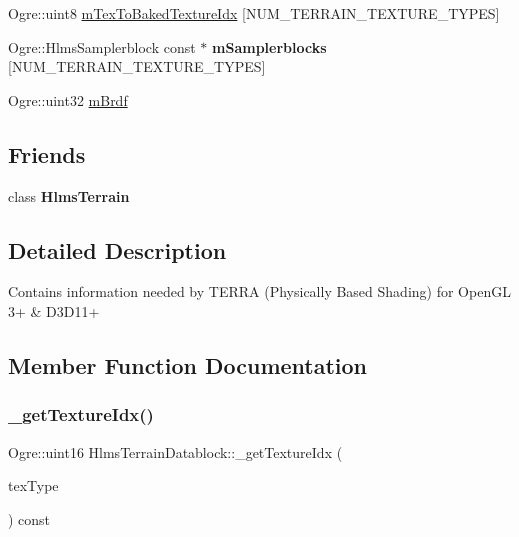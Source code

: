 \begin{DoxyCompactItemize}
Ogre\+::uint8 \hyperlink{class_hlms_terrain_datablock_acb2652e4731f6cf65b232393531b1d11}{m\+Tex\+To\+Baked\+Texture\+Idx} \mbox{[}N\+U\+M\+\_\+\+T\+E\+R\+R\+A\+I\+N\+\_\+\+T\+E\+X\+T\+U\+R\+E\+\_\+\+T\+Y\+P\+ES\mbox{]}
\item 
\mbox{\label{class_hlms_terrain_datablock_a7ea68e0c344afb54fa5963f9227a768f}} 
Ogre\+::\+Hlms\+Samplerblock const  $\ast$ {\bfseries m\+Samplerblocks} \mbox{[}N\+U\+M\+\_\+\+T\+E\+R\+R\+A\+I\+N\+\_\+\+T\+E\+X\+T\+U\+R\+E\+\_\+\+T\+Y\+P\+ES\mbox{]}
\item 
Ogre\+::uint32 \hyperlink{class_hlms_terrain_datablock_aec0c1743fab32d302e794a1149139443}{m\+Brdf}
\end{DoxyCompactItemize}
\subsection*{Friends}
\begin{DoxyCompactItemize}
\item 
\mbox{\label{class_hlms_terrain_datablock_aa6bf7069e8c5d0a65a557474ec8dff5d}} 
class {\bfseries Hlms\+Terrain}
\end{DoxyCompactItemize}


\subsection{Detailed Description}
Contains information needed by T\+E\+R\+RA (Physically Based Shading) for Open\+GL 3+ \& D3\+D11+ 

\subsection{Member Function Documentation}
\mbox{\label{class_hlms_terrain_datablock_af9f5260f2d4238492c9ef2d78e1bc0cb}} 
\subsubsection{\texorpdfstring{\+\_\+get\+Texture\+Idx()}{\_getTextureIdx()}}
{\footnotesize\ttfamily Ogre\+::uint16 Hlms\+Terrain\+Datablock\+::\+\_\+get\+Texture\+Idx (\begin{DoxyParamCaption}\item[{Terrain\+Texture\+Types}]{tex\+Type }\end{DoxyParamCaption}) const\hspace{0.3cm}{\ttfamily [inline]}}


